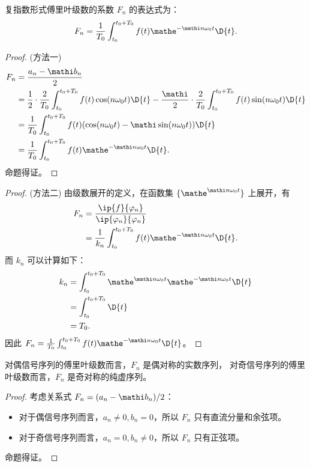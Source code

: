 \begin{property}
    复指数形式傅里叶级数的系数 $F_n$ 的表达式为：
    \begin{align*}
        F_n = \frac{1}{T_0}\int_{t_0}^{t_0 + T_0}f(t)\mathe^{-\mathi n\omega_0 t}\D{t}.
    \end{align*}
\end{property}

\begin{proof}
    (方法一)
    \begin{align*}
        F_n & = \frac{a_n - \mathi b_n}{2} \\
        & = \frac{1}{2} \cdot \frac{2}{T_0}\int_{t_0}^{t_0 + T_0}f(t)\cos(n\omega_0 t)\D{t} - \frac{\mathi}{2} \cdot \frac{2}{T_0}\int_{t_0}^{t_0 + T_0}f(t)\sin(n\omega_0 t)\D{t} \\
        & = \frac{1}{T_0}\int_{t_0}^{t_0 + T_0}f(t)(\cos(n\omega_0 t) - \mathi \sin(n\omega_0 t))\D{t} \\
        & = \frac{1}{T_0}\int_{t_0}^{t_0 + T_0}f(t)\mathe^{-\mathi n\omega_0 t}\D{t}.
    \end{align*}
    命题得证。
\end{proof}

\begin{proof}
    (方法二)
    由级数展开的定义，在函数集 $\{\mathe^{\mathi n\omega_0 t}\}$ 上展开，有
    \begin{align*}
        F_n & = \frac{\ip{f}{\varphi_n}}{\ip{\varphi_n}{\varphi_n}}\\
        & = \frac{1}{k_n}\int_{t_0}^{t_0 + T_0}f(t) \mathe^{-\mathi n\omega_0 t}\D{t}.
    \end{align*}
    而 $k_n$ 可以计算如下：
    \begin{align*}
        k_n & = \int_{t_0}^{t_0 + T_0}\mathe^{\mathi n\omega_0 t}\mathe^{-\mathi n\omega_0 t}\D{t} \\
        & = \int_{t_0}^{t_0 + T_0}\D{t} \\
        & = T_0.
    \end{align*}
    因此 $F_n = \frac{1}{T_0}\int_{t_0}^{t_0 + T_0}f(t)\mathe^{-\mathi n\omega_0 t}\D{t}$。
\end{proof}

\begin{property}
    对偶信号序列的傅里叶级数而言，$F_n$ 是偶对称的实数序列，
    对奇信号序列的傅里叶级数而言，$F_n$ 是奇对称的纯虚序列。
\end{property}

\begin{proof}
    考虑关系式 $F_n = (a_n - \mathi b_n) / 2$：
    \begin{itemize}
        \item 对于偶信号序列而言，$a_n \neq 0, b_n = 0$，所以 $F_n$ 只有直流分量和余弦项。
        \item 对于奇信号序列而言，$a_n = 0, b_n \neq 0$，所以 $F_n$ 只有正弦项。
    \end{itemize}
    命题得证。
\end{proof}

